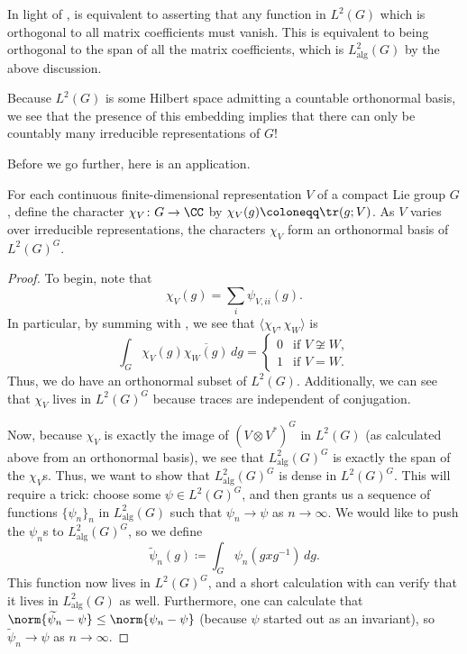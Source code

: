 \documentclass[../notes.tex]{subfiles}
\begin{document}
\begin{remark} \label{rem:easier-pw}
	In light of ,  is equivalent to asserting that any function in $L^2(G)$ which is orthogonal to all matrix coefficients must vanish. This is equivalent to being orthogonal to the span of all the matrix coefficients, which is $L^2_{\mathrm{alg}}(G)$ by the above discussion.
\end{remark}
\begin{remark}
	Because $L^2(G)$ is some Hilbert space admitting a countable orthonormal basis, we see that the presence of this embedding implies that there can only be countably many irreducible representations of $G$!
\end{remark}
Before we go further, here is an application.
\begin{corollary} \label{cor:chars-are-dense}
	For each continuous finite-dimensional representation $V$ of a compact Lie group $G$, define the character $\chi_V\colon G\to\CC$ by $\chi_V(g)\coloneqq\tr(g;V)$. As $V$ varies over irreducible representations, the characters $\chi_V$ form an orthonormal basis of $L^2(G)^G$.
\end{corollary}
\begin{proof}
	To begin, note that
	\[\chi_V(g)=\sum_{i}\psi_{V,ii}(g).\]
	In particular, by summing with , we see that $\langle\chi_V,\chi_W\rangle$ is
	\[\int_G\chi_V(g)\overline{\chi_W(g)}\,dg=\begin{cases}
		0 & \text{if }V\not\cong W, \\
		1 & \text{if }V=W.
	\end{cases}\]
	Thus, we do have an orthonormal subset of $L^2(G)$. Additionally, we can see that $\chi_V$ lives in $L^2(G)^G$ because traces are independent of conjugation.

	Now, because $\chi_V$ is exactly the image of $(V\otimes V^*)^G$ in $L^2(G)$ (as calculated above from an orthonormal basis), we see that $L^2_{\mathrm{alg}}(G)^G$ is exactly the span of the $\chi_V$s. Thus, we want to show that $L^2_{\mathrm{alg}}(G)^G$ is dense in $L^2(G)^G$. This will require a trick: choose some $\psi\in L^2(G)^G$, and then  grants us a sequence of functions $\{\psi_n\}_n$ in $L^2_{\mathrm{alg}}(G)$ such that $\psi_n\to\psi$ as $n\to\infty$. We would like to push the $\psi_n$s to $L^2_{\mathrm{alg}}(G)^G$, so we define
	\[\widetilde\psi_n(g)\coloneqq\int_G\psi_n\left(gxg^{-1}\right)\,dg.\]
	This function now lives in $L^2(G)^G$, and a short calculation with  can verify that it lives in $L^2_{\mathrm{alg}}(G)$ as well. Furthermore, one can calculate that $\norm{\widetilde\psi_n-\psi}\le\norm{\psi_n-\psi}$ (because $\psi$ started out as an invariant), so $\widetilde\psi_n\to\psi$ as $n\to\infty$.
\end{proof}
\end{document}
